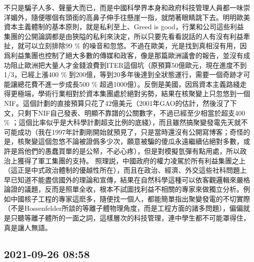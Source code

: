 \documentclass[twocolumn]{ctexart}
\begin{document}
不只是騙子人多、聲量大而已，而是中國科學界本身和政府科技管理人員都一味崇洋媚外，隨便哪個有頭銜的高鼻子伸手往懸崖一指，就閉著眼睛跳下去。明明歐美資本主義體制的基本原則，就是私利至上、Greed is good，行業和公司這些利益集團的公開論調都是由狹隘的私利來決定，所以只要先看看説話的人有沒有利益牽扯，就可以立刻排除99 \% 的噪音和忽悠。不過在歐美，光是找到真相沒有用，因爲利益集團也控制了絕大多數的傳媒和政客，像是那篇歐洲議會的報告，並沒有成功阻止歐洲把大量人才金錢浪費到ITER這個坑（原預算50億歐元，現在進度不到1/3，已經上漲400 \% 到200億，等到20多年後達到全狀態運行，需要一個奇跡才可能讓總花費不進一步成長500 \% 超過1000億）。反倒是美國，因爲資本主義路綫走得更極端，學術行業相對於資本集團處於絕對劣勢，結果在核聚變上只忽悠到一個NIF。這個計劃的直接預算只花了42億美元（2001年GAO的估計，然後沒了下文，只剩下NIF自己發表、明顯不靠譜的公關數字，不過已經至少相當於超支400 \% ；這個比率似乎是大科學計劃超支比例的底綫），而且雖然搞聚變發電先天就不可能成功（我在1997年計劃剛開始就預見了，只是當時還沒有公開寫博客；奇怪的是，核聚變這個忽悠不論被證僞多少次，願意被騙的傻瓜永遠繼續佔絕對多數，或許是爲他們的愚蠢買單的是公帑，不必心疼），但是對模擬氫彈有點用處，所以政治上獲得了軍工集團的支持。
照理説，中國政府的權力凌駕於所有利益集團之上（這正是中式政治體制的優越性所在），而且在政治、經濟、外交這些社科問題上早已知道不能盡信國外的理論和宣傳，結果在自然科學這種可以依客觀邏輯來嚴格論證的議題，反而是照單全收，根本不試圖找利益不相關的專家來做獨立分析。例如中國核子工程的專家這麽多，隨便找一個人，都能簡單指出聚變發電的不切實際（不是Hossenfelder所談的等離子體物理角度，而是工程方面的諸多問題），偏偏就是只聽等離子體所的一面之詞，這樣層次的科技管理，連中學生都不可能罩得住，真是讓人無語。
\subsection*{2021-09-26 08:58}
\end{document}
